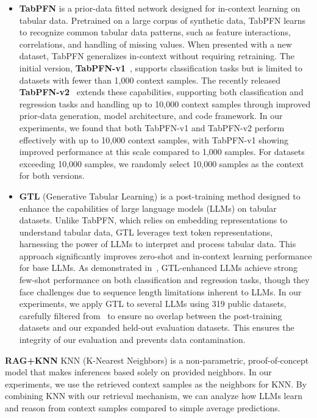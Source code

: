 \begin{itemize}
    \item \textbf{TabPFN} is a prior-data fitted network designed for in-context learning on tabular data. Pretrained on a large corpus of synthetic data, TabPFN learns to recognize common tabular data patterns, such as feature interactions, correlations, and handling of missing values. When presented with a new dataset, TabPFN generalizes in-context without requiring retraining. The initial version, \textbf{TabPFN-v1}~\citep{hollmann2023TabPFN}, supports classification tasks but is limited to datasets with fewer than 1,000 context samples. The recently released \textbf{TabPFN-v2}~\citep{hollmann2025TabPFNv2} extends these capabilities, supporting both classification and regression tasks and handling up to 10,000 context samples through improved prior-data generation, model architecture, and code framework. In our experiments, we found that both TabPFN-v1 and TabPFN-v2 perform effectively with up to 10,000 context samples, with TabPFN-v1 showing improved performance at this scale compared to 1,000 samples. For datasets exceeding 10,000 samples, we randomly select 10,000 samples as the context for both versions.

    \item \textbf{GTL} (Generative Tabular Learning) is a post-training method designed to enhance the capabilities of large language models (LLMs) on tabular datasets. Unlike TabPFN, which relies on embedding representations to understand tabular data, GTL leverages text token representations, harnessing the power of LLMs to interpret and process tabular data. This approach significantly improves zero-shot and in-context learning performance for base LLMs. As demonstrated in~\citep{wen2024GTL}, GTL-enhanced LLMs achieve strong few-shot performance on both classification and regression tasks, though they face challenges due to sequence length limitations inherent to LLMs. In our experiments, we apply GTL to several LLMs using 319 public datasets, carefully filtered from~\citep{wen2024GTL} to ensure no overlap between the post-training datasets and our expanded held-out evaluation datasets. This ensures the integrity of our evaluation and prevents data contamination.
\end{itemize}

\textbf{RAG+KNN}
KNN (K-Nearest Neighbors) is a non-parametric, proof-of-concept model that makes inferences based solely on provided neighbors. In our experiments, we use the retrieved context samples as the neighbors for KNN. By combining KNN with our retrieval mechanism, we can analyze how LLMs learn and reason from context samples compared to simple average predictions.

